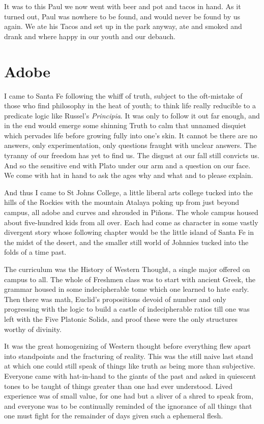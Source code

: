 \documentclass[ebook, 10pt, openright, onecolumn]{memoir}
\begin{document}
It was to this Paul we now went with beer and pot and tacos in hand.  As it
turned out, Paul was nowhere to be found, and would never be found by us again.
We ate his Tacos and set up in the park anyway, ate and smoked and drank and
where happy in our youth and our debauch.

\chapter{Adobe}
\label{cha:adobe}

I came to Santa Fe following the whiff of truth, subject to the oft-mistake of
those who find philosophy in the heat of youth; to think life really reducible
to a predicate logic like Russel's \textit{Principia}. It was only to follow it
out far enough, and in the end would emerge some shinning Truth to calm that
unnamed disquiet which pervades life before growing fully into one's skin.  It
cannot be there are no answers, only experimentation, only questions fraught
with unclear answers.  The tyranny of our freedom has yet to find us.  The
disgust at our fall still convicts us.  And so the sensitive end with Plato
under our arm and a question on our face.  We come with hat in hand to ask the
ages why and what and to please explain.

And thus I came to St Johns College, a little liberal arts college tucked into
the hills of the Rockies with the mountain Atalaya poking up from just beyond
campus, all adobe and curves and shrouded in Piñons.  The whole campus housed
about five-hundred kids from all over.  Each had come as character in some
vastly divergent story whose following chapter would be the little island of
Santa Fe in the midst of the desert, and the smaller still world of Johnnies
tucked into the folds of a time past. 

The curriculum was the History of Western Thought, a single major offered
on campus to all.  The whole of Freshmen class was to start with ancient Greek,
the grammar housed in some indecipherable tome which one learned to hate early.
Then there was math, Euclid's propositions devoid of number and only progressing
with the logic to build a castle of indecipherable ratios till one was left with
the Five Platonic Solids, and proof these were the only structures worthy of
divinity.  

It was the great homogenizing of Western thought before everything flew apart
into standpoints and the fracturing of reality.  This was the still naive last
stand at which one could still speak of things like truth as being more than
subjective.  Everyone came with hat-in-hand to the giants of the past and asked
in quiescent tones to be taught of things greater than one had ever understood.
Lived experience was of small value, for one had but a sliver of a shred to
speak from, and everyone was to be continually reminded of the ignorance of all
things that one must fight for the remainder of days given such a ephemeral
flesh.
\end{document}
